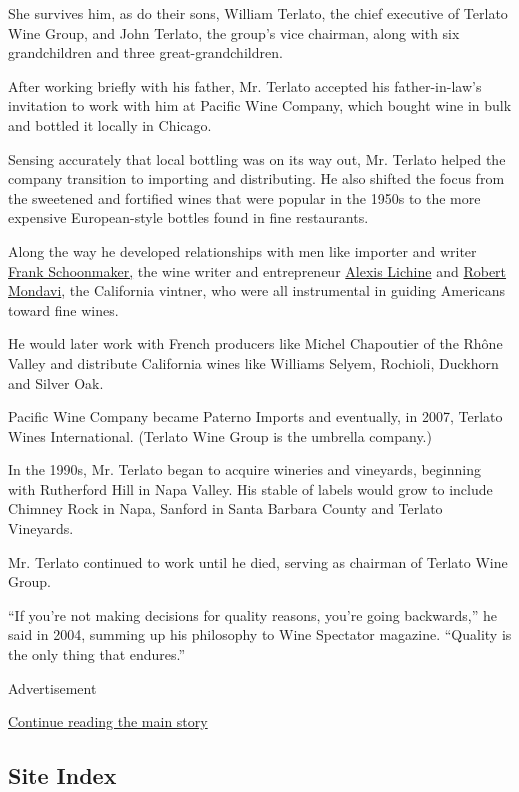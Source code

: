 She survives him, as do their sons, William Terlato, the chief executive
of Terlato Wine Group, and John Terlato, the group's vice chairman,
along with six grandchildren and three great-grandchildren.

After working briefly with his father, Mr. Terlato accepted his
father-in-law's invitation to work with him at Pacific Wine Company,
which bought wine in bulk and bottled it locally in Chicago.

Sensing accurately that local bottling was on its way out, Mr. Terlato
helped the company transition to importing and distributing. He also
shifted the focus from the sweetened and fortified wines that were
popular in the 1950s to the more expensive European-style bottles found
in fine restaurants.

Along the way he developed relationships with men like importer and
writer
\href{http://www.frankjohnsonselections.com/frank\%20schoonmaker.pdf}{Frank
Schoonmaker,} the wine writer and entrepreneur
\href{https://www.nytimes3xbfgragh.onion/1989/06/02/obituaries/alexis-lichine-76-an-author-and-expert-on-wine.html}{Alexis
Lichine} and
\href{https://www.nytimes3xbfgragh.onion/2008/05/17/business/17mondavi.html}{Robert
Mondavi}, the California vintner, who were all instrumental in guiding
Americans toward fine wines.

He would later work with French producers like Michel Chapoutier of the
Rhône Valley and distribute California wines like Williams Selyem,
Rochioli, Duckhorn and Silver Oak.

Pacific Wine Company became Paterno Imports and eventually, in 2007,
Terlato Wines International. (Terlato Wine Group is the umbrella
company.)

In the 1990s, Mr. Terlato began to acquire wineries and vineyards,
beginning with Rutherford Hill in Napa Valley. His stable of labels
would grow to include Chimney Rock in Napa, Sanford in Santa Barbara
County and Terlato Vineyards.

Mr. Terlato continued to work until he died, serving as chairman of
Terlato Wine Group.

``If you're not making decisions for quality reasons, you're going
backwards,'' he said in 2004, summing up his philosophy to Wine
Spectator magazine. ``Quality is the only thing that endures.''

Advertisement

\protect\hyperlink{after-bottom}{Continue reading the main story}

\hypertarget{site-index}{%
\subsection{Site Index}\label{site-index}}


